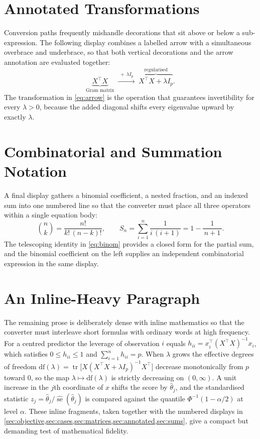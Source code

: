 \documentclass[11pt]{article}
\begin{document}
\section{Annotated Transformations}
\label{sec:annotated}

Conversion paths frequently mishandle decorations that sit above or below a
sub-expression. The following display combines a labelled arrow with a
simultaneous overbrace and underbrace, so that both vertical decorations and the
arrow annotation are evaluated together:
\begin{equation}
\underbrace{X^{\top}X}_{\text{Gram matrix}}
\;\xrightarrow{\;+\,\lambda I_p\;}\;
\overbrace{X^{\top}X + \lambda I_p}^{\text{regularised}} .
\label{eq:arrow}
\end{equation}
The transformation in \cref{eq:arrow} is the operation that guarantees
invertibility for every $\lambda > 0$, because the added diagonal shifts every
eigenvalue upward by exactly $\lambda$.

\section{Combinatorial and Summation Notation}
\label{sec:sums}

A final display gathers a binomial coefficient, a nested fraction, and an
indexed sum into one numbered line so that the converter must place all three
operators within a single equation body:
\begin{equation}
\binom{n}{k}
= \frac{n!}{k!\,(n-k)!},
\qquad
S_n = \sum_{i=1}^{n} \frac{1}{i\,(i+1)}
    = 1 - \frac{1}{\,n+1\,}.
\label{eq:binom}
\end{equation}
The telescoping identity in \cref{eq:binom} provides a closed form for the
partial sum, and the binomial coefficient on the left supplies an independent
combinatorial expression in the same display.

\section{An Inline-Heavy Paragraph}
\label{sec:inline}

The remaining prose is deliberately dense with inline mathematics so that the
converter must interleave short formulas with ordinary words at high frequency.
For a centred predictor the leverage of observation $i$ equals
$h_{ii} = x_i^{\top}(X^{\top}X)^{-1}x_i$, which satisfies
$0 \leq h_{ii} \leq 1$ and $\sum_{i=1}^{n} h_{ii} = p$. When $\lambda$ grows the
effective degrees of freedom
$\mathrm{df}(\lambda) = \operatorname{tr}\!\bigl[X(X^{\top}X+\lambda I_p)^{-1}X^{\top}\bigr]$
decrease monotonically from $p$ toward $0$, so the map
$\lambda \mapsto \mathrm{df}(\lambda)$ is strictly decreasing on
$(0, \infty)$. A unit increase in the $j$th coordinate of $x$ shifts the score
by $\hat{\theta}_j$, and the standardised statistic
$z_j = \hat{\theta}_j / \widehat{\operatorname{se}}(\hat{\theta}_j)$ is compared
against the quantile $\Phi^{-1}(1-\alpha/2)$ at level $\alpha$. These inline
fragments, taken together with the numbered displays in
\cref{sec:objective,sec:cases,sec:matrices,sec:annotated,sec:sums}, give a
compact but demanding test of mathematical fidelity.
\end{document}
